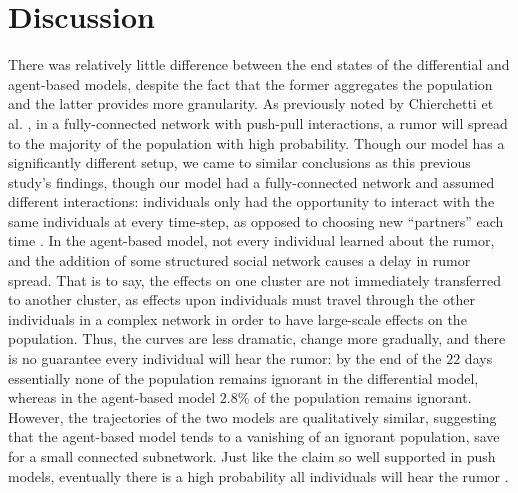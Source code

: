 \section{Discussion }
\label{sec:discussion}

There was relatively little difference between the end states of the differential and agent-based models, despite the fact that the former aggregates the population and the latter provides more granularity. As previously noted by Chierchetti et al. \cite{chierchetti-2010}, in a fully-connected network with push-pull interactions, a rumor will spread to the majority of the population with high probability. Though our model has a significantly different setup, we came to similar conclusions as this previous study's findings, though our model had a fully-connected network and assumed different interactions: individuals only had the opportunity to interact with the same individuals at every time-step, as opposed to choosing new ``partners'' each time \cite{chierchetti-2010}. In the agent-based model, not every individual learned about the rumor, and the addition of some structured social network causes a delay in rumor spread. That is to say, the effects on one cluster are not immediately transferred to another cluster, as effects upon individuals must travel through the other individuals in a complex network in order to have large-scale effects on the population. Thus, the curves are less dramatic, change more gradually, and there is no guarantee every individual will hear the rumor: by the end of the $ 22 $ days essentially none of the population remains ignorant in the differential model, whereas in the agent-based model $ 2.8\% $ of the population remains ignorant. However, the trajectories of the two models are qualitatively similar, suggesting that the agent-based model tends to a vanishing of an ignorant population, save for a small connected subnetwork. Just like the claim so well supported in push models, eventually there is a high probability all individuals will hear the rumor \cite{pittel-1987, angelopoulos-2009}.

